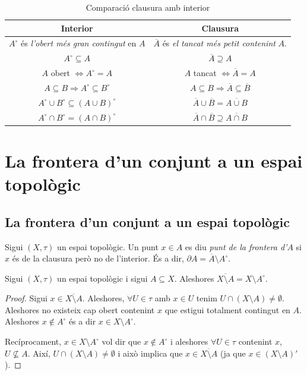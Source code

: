 \documentclass[../main.tex]{subfiles}
\begin{document}
\begin{table}[H]
    \centering
    \begin{tabular}{|c|c|}
    \hline
        \textbf{Interior} & \textbf{Clausura} \\\hline\hline
        $A^\circ$ és \textit{l'obert més gran contingut} en $A$ & $\overline{A}$ és \textit{el tancat més petit contenint} $A$. \\\hline
        $A^\circ\subseteq A$ & $\overline{A}\supseteq A$ \\\hline
        $A$ obert $\Leftrightarrow A^\circ = A$ & $A$ tancat $\Leftrightarrow \overline{A} = A$\\\hline
        $A\subseteq B\Rightarrow A^\circ\subseteq B
        ^\circ$ & $A\subseteq B \Rightarrow \overline{A}\subseteq\overline{B}$ \\\hline
        $A^\circ\cup B^\circ\subseteq (A\cup B)^\circ$ & $\overline{A}\cup \overline{B} = \overline{A\cup B}$\\\hline
        $A^\circ\cap B^\circ = (A\cap B)^\circ$ & $\overline{A}\cap \overline{B}\supseteq \overline{A\cap B}$\\\hline
    \end{tabular}
    \caption{Comparació clausura amb interior}
    \label{tab:my_label}
\end{table}

\section{La frontera d'un conjunt a un espai topològic}
\subsection{La frontera d'un conjunt a un espai topològic}

\begin{defi}
[Frontera]\label{def:frontera} Sigui $(X,\tau)$ un espai topològic. Un punt $x\in A$ es diu \textit{punt de la frontera d'$A$} si $x$ és de la clausura però no de l'interior. És a dir, $\partial A = \overline{A}\setminus A^\circ$.
\end{defi}

\begin{lema}
\label{lema:laclausuradelcomplementarieselcomplementaridelinterior} Sigui $(X,\tau)$ un espai topològic i sigui $A\subseteq X$. Aleshores $\overline{X\setminus A} = X\setminus A^\circ$.
\end{lema}
\begin{proof}
Sigui $x\in\overline{X\setminus A}$. Aleshores, $\forall U\in\tau$ amb $x\in U$ tenim $U\cap(X\setminus A)\not=\emptyset$. Aleshores no existeix cap obert contenint $x$ que estigui totalment contingut en $A$. Aleshores $x\not\in A^\circ$ és a dir $x\in X\setminus A^\circ$.

Recíprocament, $x\in X\setminus A^\circ$ vol dir que $x\not\in A^\circ$ i aleshores $\forall U\in\tau$ contenint $x$, $U\not\subseteq A$. Així, $U\cap (X\setminus A)\not=\emptyset$ i això implica que $x\in\overline{X\setminus A}$ (ja que $x\in (X\setminus A)'$).
\end{proof}
\end{document}
